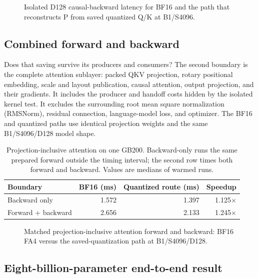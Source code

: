 \begin{figure}[H]
\centering
{}
\caption{Isolated D128 causal-backward latency for BF16 and the path that
reconstructs P from saved quantized Q/K at B1/S4096.}
\label{fig:causal-isolated-shape-speedups}
\end{figure}

\subsection{Combined forward and backward}

Does that saving survive its producers and consumers?  The second boundary is
the complete attention sublayer: packed QKV projection,
rotary positional embedding, scale and layout publication, causal attention,
output projection, and their gradients.  It includes the producer and handoff
costs hidden by the isolated kernel test.  It excludes the surrounding root
mean square normalization (RMSNorm), residual connection, language-model
loss, and optimizer.  The BF16 and quantized paths use identical
projection weights and the same B1/S4096/D128 model shape.

\begin{table}[htbp]
\centering
\caption{Projection-inclusive attention on one GB200.  Backward-only runs the
same prepared forward outside the timing interval; the second row times both
forward and backward.  Values are medians of warmed runs.}
\label{tab:causal-combined-forward-backward}
\small
\begin{tabular}{lrrr}
\toprule
Boundary & BF16 (ms) & Quantized route (ms) & Speedup \\
\midrule
Backward only & 1.572 & 1.397 & 1.125$\times$ \\
Forward + backward & 2.656 & 2.133 & 1.245$\times$ \\
\bottomrule
\end{tabular}
\end{table}
\FloatBarrier

\begin{figure}[H]
\centering
{}
\caption{Matched projection-inclusive attention forward and backward:
BF16 FA4 versus the saved-quantization path at B1/S4096/D128.}
\label{fig:causal-combined-forward-backward}
\end{figure}

\subsection{Eight-billion-parameter end-to-end result}

